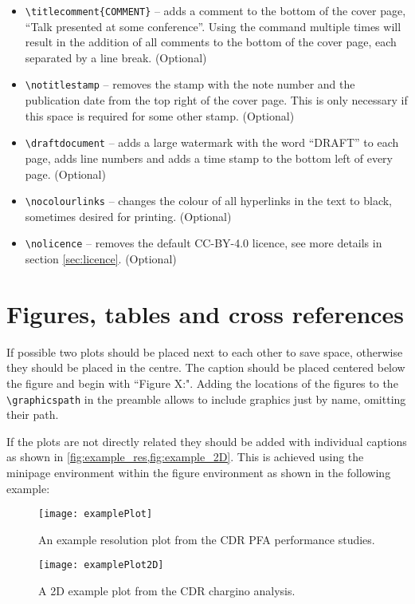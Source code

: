 \begin{itemize}
  \item \texttt{\textbackslash titlecomment\{COMMENT\}} -- adds a comment to the bottom of the cover page, \ie ``Talk presented at some conference''.  Using the command multiple times will result in the addition of all comments to the bottom of the cover page, each separated by a line break. (Optional)
  \item \texttt{\textbackslash notitlestamp} -- removes the stamp with the note number and the publication date from the top right of the cover page. This is only necessary if this space is required for some other stamp. (Optional)
  \item \texttt{\textbackslash draftdocument} -- adds a large watermark with the word ``DRAFT'' to each page, adds line numbers and adds a time stamp to the bottom left of every page. (Optional)
  \item \texttt{\textbackslash nocolourlinks} -- changes the colour of all hyperlinks in the text to black, sometimes desired for printing. (Optional)
  \item \texttt{\textbackslash nolicence} -- removes the default CC-BY-4.0 licence, see more details in section \cref{sec:licence}. (Optional)
\end{itemize}


\section{Figures, tables and cross references}
\label{sec:figures}

If possible two plots should be placed next to each other to save space, otherwise they should be placed in the centre. The caption should be placed centered below the figure and begin with ``Figure X:". Adding the locations of the figures to the \texttt{\textbackslash graphicspath} in the preamble allows to include graphics just by name, omitting their path.

If the plots are not directly related they should be added with individual captions as shown in \cref{fig:example_res,fig:example_2D}. This is achieved using the minipage environment within the figure environment as shown in the following example:

\begin{figure}
  \begin{minipage}[b]{0.48\textwidth}
    \texttt{[image: examplePlot]}
    \caption{An example resolution plot from the CDR PFA performance studies.}
    \label{fig:example_res}
  \end{minipage}%
  \hfill %
  \begin{minipage}[b]{0.48\textwidth}
    \texttt{[image: examplePlot2D]}
    \caption{A 2D example plot from the CDR chargino analysis.}
    \label{fig:example_2D}
  \end{minipage}
\end{figure}

